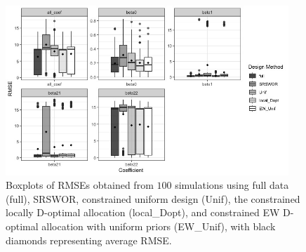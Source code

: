 \begin{figure}[htb!]
    \centering
    \includegraphics[width=0.95\textwidth]{figures/RMSE_paid.png}
    \caption{Boxplots of RMSEs obtained from $100$ simulations  using full data (full), SRSWOR, constrained uniform design (Unif), the constrained locally D-optimal allocation (local\_Dopt), and constrained EW D-optimal allocation with uniform priors (EW\_Unif), with black diamonds representing average RMSE.}
    \label{fig:RMSE_GLM}
\end{figure}

